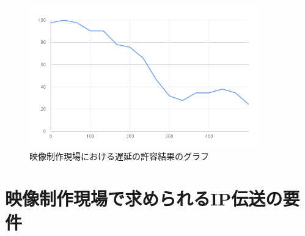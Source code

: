 \begin{figure}[htbp]
  \begin{center}
    \includegraphics[bb=0 0 600 371,width=10cm]{img/mv-delay-result-graph.png}
  \end{center}
  \caption{映像制作現場における遅延の許容結果のグラフ}
  \label{fig:mv-delay-result-graph}
\end{figure}


%
%
%
%
%
%
%
%

\section{映像制作現場で求められるIP伝送の要件}

